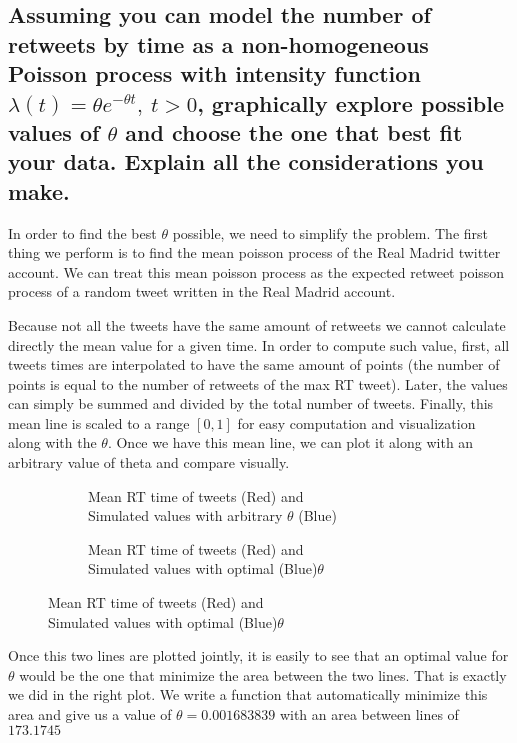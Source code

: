 \documentclass[11pt, a4paper]{article}
\begin{document}
\subsection{Assuming you can model the number of retweets by time as a non-homogeneous Poisson process with intensity function $ \lambda (t) = \theta e^{-\theta t},\ t>0$, graphically explore possible values of $\theta$ and choose the one that best fit your data. Explain all the considerations you make.}

In order to find the best $\theta$ possible, we need to simplify the problem. 
The first thing we perform is to find the mean poisson process of the Real Madrid twitter account. 
We can treat this mean poisson process as the expected retweet poisson process of a random tweet written in the Real Madrid account.

Because not all the tweets have the same amount of retweets we cannot calculate directly the mean value for a given time. 
In order to compute such value, first, all tweets times are interpolated to have the same amount of points (the number of points is equal to the number of retweets of the max RT tweet). 
Later, the values can simply be summed and divided by the total number of tweets. Finally, this mean line is scaled to a range $[0, 1]$ for easy computation and visualization along with the $\theta$.
Once we have this mean line, we can plot it along with an arbitrary value of theta and compare visually.

\begin{figure}[H]
	\centering
	\begin{subfigure}{.5\textwidth}
		\centering
		
		\caption{Mean RT time of tweets (Red) and \\ Simulated values with arbitrary $\theta$ (Blue)}
		\label{fig:thetaNot}
	\end{subfigure}%
	\begin{subfigure}{.5\textwidth}
		\centering
		
		\caption{Mean RT time of tweets (Red) and \\Simulated values with optimal (Blue)$\theta$}
		\label{fig:thetaYes}
	\end{subfigure}
\end{figure}


Once this two lines are plotted jointly, it is easily to see that an optimal value for $\theta$ would be the one that minimize the area between the two lines. 
That is exactly we did in the right plot. 
We write a function that automatically minimize this area and give us a value of $\theta=0.001683839$ with an area between lines of $173.1745$
\end{document}
